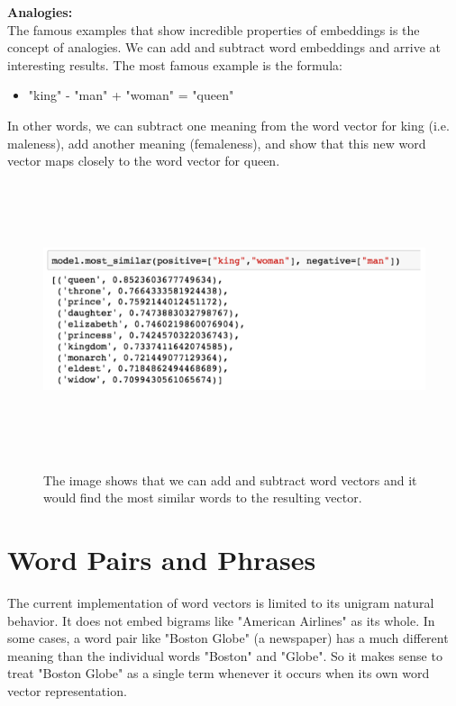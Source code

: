 \noindent \textbf{Analogies:}\\

The famous examples that show incredible properties of embeddings is the concept of analogies. We can add and subtract word embeddings and arrive at interesting results. The most famous example is the formula:
\begin{itemize}
\item{"king" - "man" + "woman" = "queen"}
\end{itemize}
In other words, we can subtract one meaning from the word vector for king (i.e. maleness), add another meaning (femaleness), and show that this new word vector maps closely to the word vector for queen.

\begin{figure}[htbp]
\centering
\includegraphics[width=16cm, height=8cm]{images/king-man+woman-gensim.png}\\
\centering
\caption{The image shows that we can add and subtract word vectors and it would find the most similar words to the resulting vector.}
\label{fig:foo}
\end{figure}

\newpage
\section{Word Pairs and Phrases}

The current implementation of word vectors is limited to its unigram natural behavior. It does not embed bigrams like "American Airlines" as its whole. In some cases, a word pair like "Boston Globe" (a newspaper) has a much different meaning than the individual words "Boston" and "Globe". So it makes sense to treat "Boston Globe" as a single term whenever it occurs when its own word vector representation.

